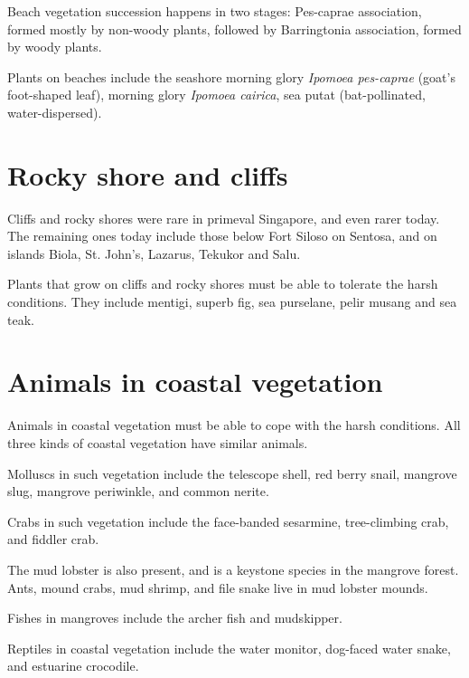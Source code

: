 \documentclass{slnotes}
\newcommand{\scn}[1]{\textit{#1}}
\begin{document}
Beach vegetation succession happens in two stages: Pes-caprae association, formed mostly by non-woody plants, followed by Barringtonia association, formed by woody plants.

Plants on beaches include the seashore morning glory \scn{Ipomoea pes-caprae} (goat's foot-shaped leaf), morning glory \scn{Ipomoea cairica}, sea putat (bat-pollinated, water-dispersed).
\section{Rocky shore and cliffs}
Cliffs and rocky shores were rare in primeval Singapore, and even rarer today. The remaining ones today include those below Fort Siloso on Sentosa, and on islands Biola, St. John's, Lazarus, Tekukor and Salu.

Plants that grow on cliffs and rocky shores must be able to tolerate the harsh conditions. They include mentigi, superb fig, sea purselane, pelir musang and sea teak.
\section{Animals in coastal vegetation}
Animals in coastal vegetation must be able to cope with the harsh conditions. All three kinds of coastal vegetation have similar animals.

Molluscs in such vegetation include the telescope shell, red berry snail, mangrove slug, mangrove periwinkle, and common nerite.

Crabs in such vegetation include the face-banded sesarmine, tree-climbing crab, and fiddler crab.

The mud lobster is also present, and is a keystone species in the mangrove forest. Ants, mound crabs, mud shrimp, and file snake live in mud lobster mounds.

Fishes in mangroves include the archer fish and mudskipper.

Reptiles in coastal vegetation include the water monitor, dog-faced water snake, and estuarine crocodile.
\end{document}
